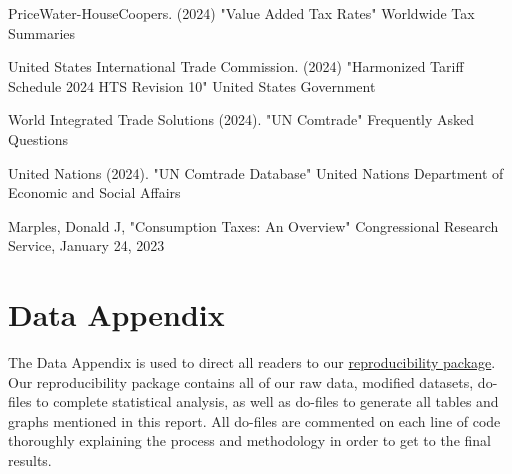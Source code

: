 \documentclass[12pt]{article}
\begin{document}
PriceWater-HouseCoopers. (2024) "Value Added Tax Rates" Worldwide Tax Summaries 

United States International Trade Commission. (2024) "Harmonized Tariff Schedule 2024 HTS Revision 10" United States Government

World Integrated Trade Solutions (2024). "UN Comtrade" Frequently Asked Questions

United Nations (2024). "UN Comtrade Database" United Nations Department of Economic and Social Affairs

Marples, Donald J, "Consumption Taxes: An Overview" Congressional Research Service, January 24, 2023

\newpage
\section*{Data Appendix} \label{sec:appendixa}

The Data Appendix is used to direct all readers to our \href{https://github.com/ecn310/course-project-taxes-tariffs/blob/main/Reproducibility_Package/README.md}{reproducibility package}. Our reproducibility package contains all of our raw data, modified datasets, do-files to complete statistical analysis, as well as do-files to generate all tables and graphs mentioned in this report. All do-files are commented on each line of code thoroughly explaining the process and methodology in order to get to the final results. 
\end{document}
